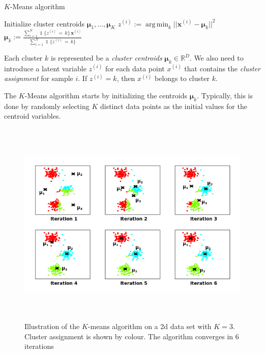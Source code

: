 \documentclass[final,3p,times,twocolumn]{elsarticle}
\DeclareMathOperator*{\argmin}{arg\,min}
\let\bs\boldsymbol
\DeclareMathOperator*{\id}{\mathds{1}}
\begin{document}
\begin{algorithm}
\caption{$K$-Means algorithm}
\label{alg:kmeans}
\begin{algorithmic}[1]
\State Initialize cluster centroids $\bs\mu_1,\dots,\bs\mu_K$
\Statex
\Repeat
{}
\State $z^{(i)} := \argmin_k ||\bs x^{(i)} - \bs\mu_k||^2$
\EndFor
\Statex
{}
\State $\bs\mu_k := \frac{\sum_{i=1}^N \id \{z^{(i)}\,=\,k\}\, \bs x^{(i)}}{\sum_{i=1}^N \id\{z^{(i)}\,=\,k\}}$
\EndFor
{}
\Statex\State\Return{$z^{(1)}, \dots, z^{(N)}, \bs\mu_1, \dots, \bs\mu_K$}
\end{algorithmic}
\end{algorithm}

Each cluster $k$ is represented be a \emph{cluster centroids} $\bs\mu_k \in \mathbb{R}^D$.
We also need to introduce a latent variable $z^{(i)}$ for each data point $x^{(i)}$ that contains the \emph{cluster assignment} for sample $i$.
If $z^{(i)} = k$, then $x^{(i)}$ belongs to cluster $k$.

The $K$-Means algorithm starts by initializing the centroids $\boldsymbol \mu_k$.
Typically, this is done by randomly selecting $K$ distinct data points as the initial values for the centroid variables.

\begin{figure}
\centering
\includegraphics[width=\textwidth,height=3.9in]{prog.png}
\caption{Illustration of the $K$-means algorithm on a 2d data set with $K=3$.
Cluster assignment is shown by colour. The algorithm converges in 6 iterations}
\label{fig:kmeans-prog}
\end{figure}
\end{document}
